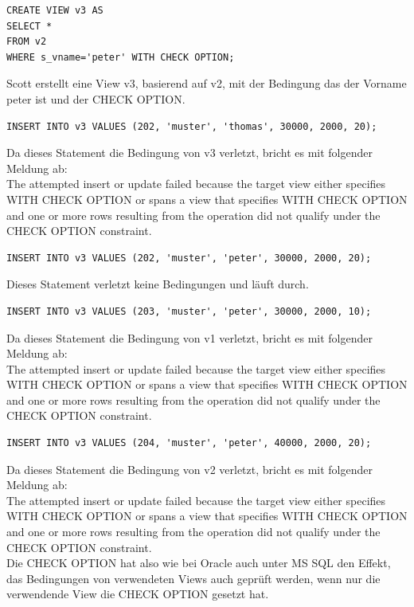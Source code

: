 \documentclass[10pt]{scrreprt}
\begin{document}
\begin{lstlisting}[style=sql]
CREATE VIEW v3 AS
SELECT *
FROM v2
WHERE s_vname='peter' WITH CHECK OPTION;
\end{lstlisting}
Scott erstellt eine View v3, basierend auf v2, mit der Bedingung das der Vorname peter ist und der CHECK OPTION.

\begin{lstlisting}[style=sql]
INSERT INTO v3 VALUES (202, 'muster', 'thomas', 30000, 2000, 20);
\end{lstlisting}
Da dieses Statement  die Bedingung von v3 verletzt, bricht es mit folgender Meldung ab:\\
The attempted insert or update failed because the target view either specifies WITH CHECK OPTION or spans a view that specifies WITH CHECK OPTION and one or more rows resulting from the operation did not qualify under the CHECK OPTION constraint.\\

\begin{lstlisting}[style=sql]
INSERT INTO v3 VALUES (202, 'muster', 'peter', 30000, 2000, 20);
\end{lstlisting}
Dieses Statement verletzt keine Bedingungen und läuft durch.

\begin{lstlisting}[style=sql]
INSERT INTO v3 VALUES (203, 'muster', 'peter', 30000, 2000, 10);
\end{lstlisting}
Da dieses Statement  die Bedingung von v1 verletzt, bricht es mit folgender Meldung ab:\\
The attempted insert or update failed because the target view either specifies WITH CHECK OPTION or spans a view that specifies WITH CHECK OPTION and one or more rows resulting from the operation did not qualify under the CHECK OPTION constraint.\\


\begin{lstlisting}[style=sql]
INSERT INTO v3 VALUES (204, 'muster', 'peter', 40000, 2000, 20);
\end{lstlisting}
Da dieses Statement  die Bedingung von v2 verletzt, bricht es mit folgender Meldung ab:\\
The attempted insert or update failed because the target view either specifies WITH CHECK OPTION or spans a view that specifies WITH CHECK OPTION and one or more rows resulting from the operation did not qualify under the CHECK OPTION constraint.\\
Die CHECK OPTION hat also wie bei Oracle auch unter MS SQL den Effekt, das Bedingungen von verwendeten Views auch geprüft werden, wenn nur die verwendende View die CHECK OPTION gesetzt hat.
\end{document}
